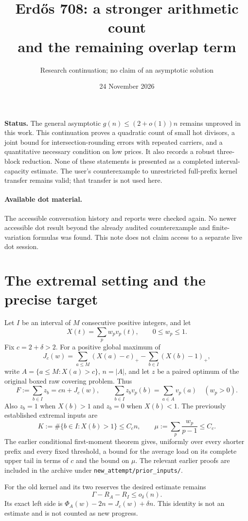 \documentclass[a4paper,11pt]{article}
\title{Erd\H{o}s 708: a stronger arithmetic count\protect\\and the remaining overlap term}
\author{Research continuation; no claim of an asymptotic solution}
\date{24 November 2026}
\newcommand{\pos}[1]{\left(#1\right)_+}
\begin{document}
\maketitle
\noindent\textbf{Status.} The general asymptotic $g(n)\le(2+o(1))n$ remains unproved in this work. This continuation proves a quadratic count of small hot divisors, a joint bound for intersection-rounding errors with repeated carriers, and a quantitative necessary condition on low prices. It also records a robust three-block reduction. None of these statements is presented as a completed interval-capacity estimate. The user's counterexample to unrestricted full-prefix kernel transfer remains valid; that transfer is not used here.

\paragraph{Available dot material.} The accessible conversation history and reports were checked again. No newer accessible dot result beyond the already audited counterexample and finite-variation formulas was found. This note does not claim access to a separate live dot session.

\section{The extremal setting and the precise target}
Let $I$ be an interval of $M$ consecutive positive integers, and let
\[
 X(t)=\sum_p w_p v_p(t),\qquad 0\le w_p\le1.
\]
Fix $c=2+\delta>2$. For a positive global maximum of
\[
 J_c(w)=\sum_{a\le M}\pos{X(a)-c}-\sum_{b\in I}\pos{X(b)-1},
\]
write $A=\{a\le M:X(a)>c\}$, $n=|A|$, and let $z$ be a paired optimum of the original boxed raw covering problem. Thus
\[
 F:=\sum_{b\in I}z_b=cn+J_c(w),\qquad
 \sum_{b\in I}z_bv_p(b)=\sum_{a\in A}v_p(a)\quad(w_p>0).
\]
Also $z_b=1$ when $X(b)>1$ and $z_b=0$ when $X(b)<1$.
The previously established extremal inputs are
\[
 K:=\#\{b\in I:X(b)>1\}\le C_c n,
 \qquad \mu:=\sum_p\frac{w_p}{p-1}\le C_c.
\]
The earlier conditional first-moment theorem gives, uniformly over every shorter prefix and every fixed threshold, a bound for the average load on its complete upper tail in terms of $c$ and the bound on $\mu$. The relevant earlier proofs are included in the archive under \texttt{new\_attempt/prior\_inputs/}.

For the old kernel and its two reserves the desired estimate remains
\[
 \Gamma-R_A-R_I\le o_\delta(n).
\]
Its exact left side is $\Phi_A(w)-2n=J_c(w)+\delta n$. This identity is not an estimate and is not counted as new progress.
\end{document}
